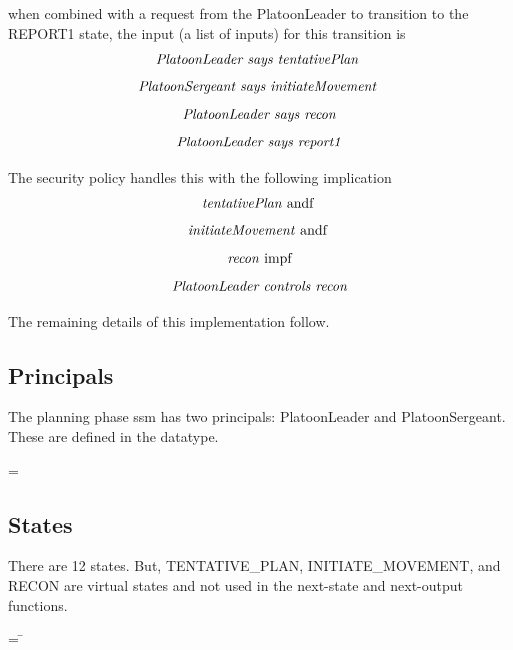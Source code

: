 \documentclass[../../main/main.tex]{subfiles}
\begin{document}
when combined with a request from the PlatoonLeader to transition to the REPORT1 state, the input (a list of inputs) for this transition is
\[\text{\textit{PlatoonLeader says tentativePlan}  }\]
\[\text{\textit{PlatoonSergeant says initiateMovement}  }\]
\[\text{\textit{PlatoonLeader says recon}}\]
\[\text{\textit{PlatoonLeader says report1}}\]

The security policy handles this with the following implication
\[\text{\textit{tentativePlan} andf  }\]
\[\text{\textit{initiateMovement} andf  }\]
\[\text{\textit{recon} impf}\]
\[\text{\textit{PlatoonLeader controls recon}}\]

The remaining details of this implementation follow.
\subsection{Principals}
The planning phase \gls{ssm} has two principals: PlatoonLeader and PlatoonSergeant.  These are defined in the  datatype.

 =  \HOLTokenBar{} 

\subsection{States}
There are 12 states.  But, TENTATIVE_PLAN, INITIATE_MOVEMENT, and RECON are virtual states and not used in the next-state and next-output functions.

\begin{tabbing}
\parskip=8pt
 = \= \\
				\>\HOLTokenBar{}  \\
				\>\HOLTokenBar{}  \\
				\>\HOLTokenBar{} \\
        				\>\HOLTokenBar{}  \\
				\>\HOLTokenBar{}  \\
				\>\HOLTokenBar{}  \\
				\>\HOLTokenBar{} \\
        				\>\HOLTokenBar{}  \\
				\>\HOLTokenBar{}  \\
				\>\HOLTokenBar{}  \\
				\>\HOLTokenBar{} 
\parskip=18pt
\end{tabbing}
\end{document}
